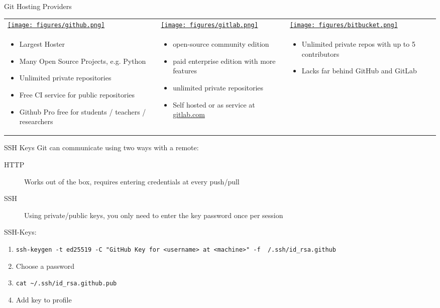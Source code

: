 \begin{frame}[c]{Git Hosting Providers}
  \small
  \begin{tabu}{@{} X[,C] @{} X[,C] @{} X[,C] @{}}
    \href{https://github.com}{\texttt{[image: figures/github.png]}} &
    \href{https://gitlab.com}{\texttt{[image: figures/gitlab.png]}} &
    \href{https://bitbucket.org}{\texttt{[image: figures/bitbucket.png]}} \\
    \begin{itemize}
      \item Largest Hoster
      \item Many Open Source Projects, e.g. Python
      \item Unlimited private repositories
      \item Free CI service for public repositories
      \item Github Pro free for students / teachers / researchers
    \end{itemize}
    &
    \begin{itemize}
      \item open-source community edition
      \item paid enterprise edition with more features
      \item unlimited private repositories
      \item Self hosted or as service at \href{https://gitlab.com}{gitlab.com}
    \end{itemize}
    &
    \begin{itemize}
      \item Unlimited private repos with up to 5 contributors
      \item Lacks far behind GitHub and GitLab
    \end{itemize}
  \end{tabu}
\end{frame}

\begin{frame}{SSH Keys}
  Git can communicate using two ways with a remote:
  \begin{description}
    \item[HTTP] Works out of the box, requires entering credentials at every push/pull
    \item[SSH] Using private/public keys, you only need to enter the key password once per session
  \end{description}

  SSH-Keys:
  \begin{enumerate}
    \item \texttt{ssh-keygen -t ed25519 -C "GitHub Key for <username> at <machine>" -f ~/.ssh/id\_rsa.github}
    \item Choose a password
    \item \texttt{cat \textasciitilde/.ssh/id\_rsa.github.pub}
    \item Add key to profile
  \end{enumerate}
\end{frame}

